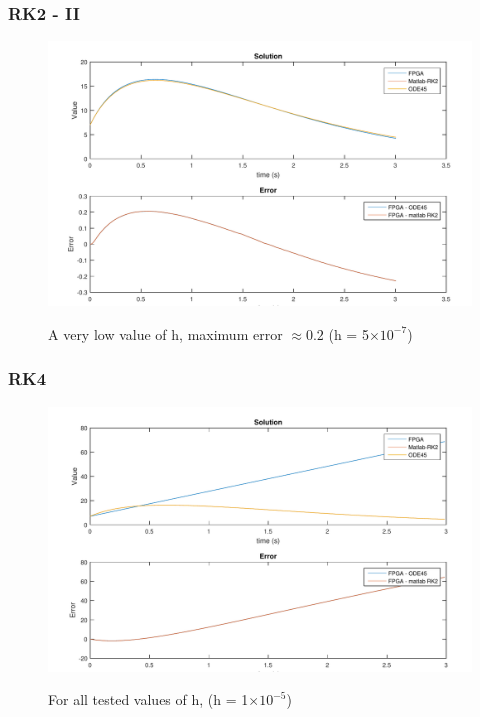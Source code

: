 \documentclass{beamer}[10]
\providecommand{\e}[1]{\ensuremath{\times 10^{#1}}}
\begin{document}
\begin{frame}
	\frametitle{RK2 - II}
	\begin{figure}
		\centering
		\includegraphics[width=\columnwidth]{figs/rk2_ts=0,0000005_os=1000}
		\label{f:rk2_ts=0,0000005_os=1000}
		\caption{A very low value of h, maximum error $\approx 0.2$ (h = 5\e{-7})}
	\end{figure}
\end{frame}

\begin{frame}
	\frametitle{RK4}
	\begin{figure}
		\centering
		\includegraphics[width=\columnwidth]{figs/rk4_ts=0,00001_os=100}
		\label{f:rk4_ts=0,00001_os=100}
		\caption{For all tested values of h, (h = 1\e{-5})}
	\end{figure}
\end{frame}
\end{document}
